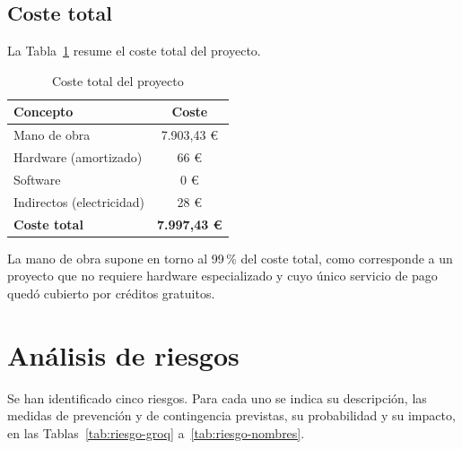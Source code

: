 \documentclass[11pt, a4paper]{report}
\begin{document}
	\subsection{Coste total}

	La Tabla~\ref{tab:coste-total} resume el coste total del proyecto.

	\begin{table}[H]
		\centering
		\begin{tabular}{|l|c|}
			\hline
			\rowcolor{tabla-header}
			\textbf{Concepto} & \textbf{Coste} \\
			\hline
			Mano de obra & 7.903,43 € \\
			\hline
			\rowcolor{fila-alterna}
			Hardware (amortizado) & 66 € \\
			\hline
			Software & 0 € \\
			\hline
			\rowcolor{fila-alterna}
			Indirectos (electricidad) & 28 € \\
			\hline
			\textbf{Coste total} & \textbf{7.997,43 €} \\
			\hline
		\end{tabular}
		\caption{Coste total del proyecto}
		\label{tab:coste-total}
	\end{table}

	La mano de obra supone en torno al 99\,\% del coste total, como corresponde a un proyecto que no requiere hardware especializado y cuyo único servicio de pago quedó cubierto por créditos gratuitos.

	\section{Análisis de riesgos}

	Se han identificado cinco riesgos. Para cada uno se indica su descripción, las medidas de prevención y de contingencia previstas, su probabilidad y su impacto, en las Tablas~\ref{tab:riesgo-groq} a~\ref{tab:riesgo-nombres}.
\end{document}
